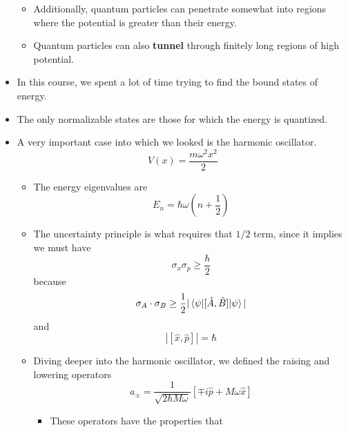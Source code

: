 \documentclass[../notes.tex]{subfiles}
\begin{document}
\begin{itemize}
    \begin{itemize}
        \item Additionally, quantum particles can penetrate somewhat into regions where the potential is greater than their energy.
        \item Quantum particles can also \textbf{tunnel} through finitely long regions of high potential.
    \end{itemize}
    \item In this course, we spent a lot of time trying to find the bound states of energy.
    \item The only normalizable states are those for which the energy is quantized.
    \item A very important case into which we looked is the harmonic oscillator.
    \begin{equation*}
        V(x) = \frac{m\omega^2x^2}{2}
    \end{equation*}
    \begin{itemize}
        \item The energy eigenvalues are
        \begin{equation*}
            E_n = \hbar\omega\left( n+\frac{1}{2} \right)
        \end{equation*}
        \item The uncertainty principle is what requires that $1/2$ term, since it implies we must have
        \begin{equation*}
            \sigma_x\sigma_p \geq \frac{\hbar}{2}
        \end{equation*}
        because
        \begin{equation*}
            \sigma_A\cdot\sigma_B \geq \frac{1}{2}|\ev{[\hat{A},\hat{B}]}{\psi}|
        \end{equation*}
        and
        \begin{equation*}
            |[\hat{x},\hat{p}]| = \hbar
        \end{equation*}
        \item Diving deeper into the harmonic oscillator, we defined the raising and lowering operators
        \begin{equation*}
            a_\pm = \frac{1}{\sqrt{2\hbar M\omega}}[\mp i\hat{p}+M\omega\hat{x}]
        \end{equation*}
        \begin{itemize}
            \item These operators have the properties that
            \begin{align*}

\end{align*}
\end{itemize}
\end{itemize}
\end{itemize}
\end{document}
